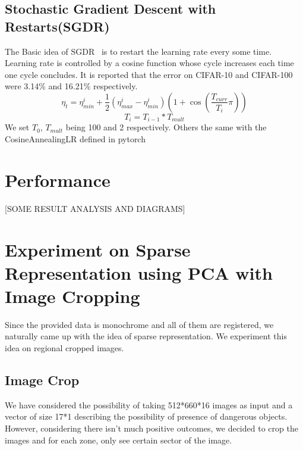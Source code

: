 \documentclass[conference,compsoc]{IEEEtran}
\begin{document}
\subsection{Stochastic Gradient Descent with Restarts(SGDR)}
The Basic idea of SGDR~\cite{loshchilov2016sgdr} is to restart the learning rate every some time. Learning rate is controlled by a cosine function whose cycle increases each time one cycle concludes. It is reported that the error on CIFAR-10 and CIFAR-100 were 3.14\% and 16.21\% respectively. 
$$ \eta_t = \eta_{min}^i + \frac{1}{2}(\eta_{max}^i-\eta_{min}^i)(1 + \cos(\frac{T_{curr}}{T_i}\pi))$$
$$ T_{i} = T_{i-1} * T_{mult} $$
We set $T_0$, $T_{mult}$ being 100 and 2 respectively. Others the same with the CosineAnnealingLR defined in pytorch

\section{Performance}
[SOME RESULT ANALYSIS AND DIAGRAMS]

\section{Experiment on Sparse Representation using PCA with Image Cropping}
Since the provided data is monochrome and all of them are registered, we naturally came up with the idea of sparse representation. We experiment this idea on regional cropped images.

\subsection{Image Crop}
We have considered the possibility of taking 512*660*16 images as input and a vector of size 17*1 describing the possibility of presence of dangerous objects. However, considering there isn't much positive outcomes, we decided to crop the images and for each zone, only see certain sector of the image.
\end{document}
